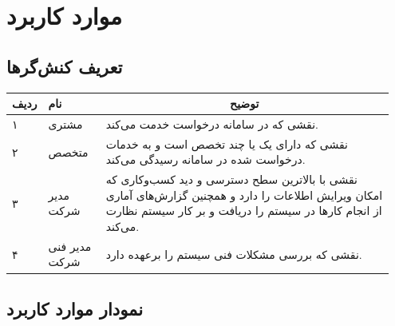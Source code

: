 
\chapter{موارد کاربرد}


\section{تعریف کنش‌گر‌ها}


\begin{table}[h]
	\setlength\extrarowheight{-5pt}
	\centering
	\begin{tabular}{|p{0.05\linewidth}|p{0.15\linewidth}|p{0.75\linewidth}|} 
\hline
\multicolumn{1}{|c|}{\textbf{ردیف}} & \textbf{نام}  & \multicolumn{1}{c|}{\textbf{توضیح}}                                                                                                                                  \\ \hline
۱                                   & مشتری         & نقشی که در سامانه درخواست خدمت می‌کند.                                                                                                                               \\ \hline
۲                                   & متخصص         & نقشی که دارای یک یا چند تخصص است و به خدمات درخواست شده در سامانه رسیدگی می‌کند.                                                                                     \\ \hline
۳                                   & مدیر شرکت     & نقشی با بالاترین سطح دسترسی و دید کسب‌و‌کاری که امکان ویرایش اطلاعات را دارد و همچنین گزارش‌های آماری از انجام کارها در سیستم را دریافت و بر کار سیستم نظارت می‌کند. \\ \hline
۴                                   & مدیر فنی شرکت & نقشی که بررسی مشکلات فنی سیستم را برعهده دارد.  
 \\ \hline

	\end{tabular}
\end{table}

\section{نمودار موارد کاربرد}



